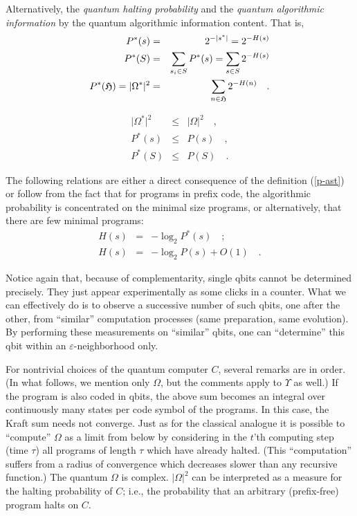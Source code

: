 Alternatively, the {\em quantum halting probability} and the {\em
quantum algorithmic information} by the quantum algorithmic information
content. That is,
\begin{eqnarray}
 P^\ast (s)&=&2^{-\vert s^\ast \vert }=2^{-H(s)} \label{p-ast}\\
 P^\ast (S)&=&\sum_{s_i\in S}P^\ast (s)=\sum_{s\in S}2^{-H(s)}\\
 P^\ast ({\cal H} )= \vert \Omega^\ast \vert^2 &=& \sum_{n\in {\cal H} }
 2^{-H(n)}\label{omega-ast} \quad  .
 \end{eqnarray}


 \begin{eqnarray}
\vert \Omega^\ast \vert^2
&\le &   \vert \Omega \vert^2
\quad ,\\
P^\ast (s)
&\le &
P (s)
\quad ,\\
P^\ast (S)
&\le &
P (S)
\quad .
 \end{eqnarray}


The following relations are either a direct consequence of the
definition (\ref{p-ast}) or follow from the fact that for programs in
prefix code, the algorithmic probability is concentrated on the minimal
size programs, or alternatively, that there are few minimal programs:
 \begin{eqnarray}
 H(s)&=&-\log_2 P^\ast (s)\label{h-p2}\quad ;\\
 H(s)&=&-\log_2 P(s)+O(1)\label{h-p}\quad .
 \end{eqnarray}

Notice again that, because of complementarity, single qbits cannot be
determined precisely. They just appear experimentally as some clicks in
a counter. What we can effectively do is to observe a successive
number of such qbits, one after the other, from ``similar'' computation
processes (same preparation, same evolution). By performing these
measurements on
``similar'' qbits, one can
``determine'' this qbit within an
$\varepsilon$-neighborhood
only.

For nontrivial choices of the quantum computer $C$,
several remarks are in order.
(In what follows, we mention only $\Omega$, but the comments apply to
$\Upsilon$ as well.)
If the program is also
coded in qbits, the above sum becomes an
integral over continuously many states per code symbol of the programs.
In this case, the Kraft sum needs not converge.
Just as for the classical analogue it is possible to ``compute''
$\Omega $ as a limit from below
by considering
in the $t$'th computing step (time $\tau$) all programs of length
$\tau$ which have already halted.
(This ``computation'' suffers
from a radius of convergence which decreases slower than any recursive
function.)
The quantum $\Omega$ is complex.
$\vert \Omega \vert^2$  can be interpreted as a
measure for the halting probability of
$C$; i.e., the probability that an arbitrary (prefix-free) program
halts on
$C$.



